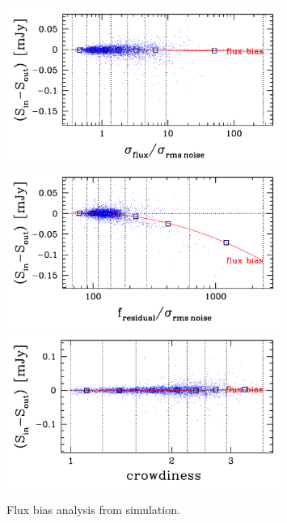 \documentclass[11pt,a4paper]{article}
\begin{document}
\begin{figure}[H]
	\includegraphics[width=0.8\textwidth]{galsim_24_fbias_1}
	\includegraphics[width=0.8\textwidth]{galsim_24_fbias_2}
	\includegraphics[width=0.8\textwidth]{galsim_24_fbias_3}
	\caption{Flux bias analysis from simulation.}
\end{figure}
\end{document}
